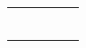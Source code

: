 \begin{tabularx}{0.99\textwidth}{c||X|X|X||X}
  \hline 
          &                             &             &                   &                               \\
  \hline 
          &                             &             &                   &                               \\
  \hline 
          &                             &             &                   &                               \\
  \hline 
          &                             &             &                   &                               \\
  \hline 
          &                             &             &                   &                               \\
  \hline 
          &                             &             &                   &                               \\
  \hline 
          &                             &             &                   &                               \\
  \bottomrule
\end{tabularx}
